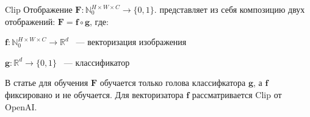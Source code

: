 \documentclass[aspectratio=169]{beamer}
\begin{document}
\begin{frame}{Clip}
Отображение $\bm{F}: \mathbb{N}_0^{H \times W \times C} \rightarrow \{ 0, 1 \}.$ представляет из себя композицию двух отображений: $\bm{F} = \bm{f} \circ \bm{g}$, где:
\begin{center}
    $\bm{f}: \mathbb{N}_0^{H \times W \times C} \rightarrow \mathbb{R}^{d}$ ~--- векторизация изображения
\end{center}
\begin{center}
    $\bm{g}: \mathbb{R}^{d} \rightarrow \{ 0, 1 \}$ ~--- классификатор
\end{center}
В статье для обучения $\bm{F}$ обучается только голова классифкатора $\bm{g}$, а $\bm{f}$ фиксировано и не обучается. Для векторизатора $\bm{f}$ рассматривается Clip от OpenAI. 
\end{frame}
\end{document}
